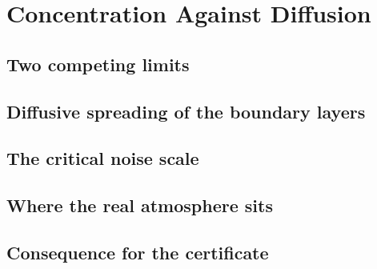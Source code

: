 %

\section{Concentration Against Diffusion}
\label{p3:sec:concentration}

\subsection{Two competing limits}
\label{p3:sub:two_competing_limits}

\subsection{Diffusive spreading of the boundary layers}
\label{p3:sub:diffusive_spreading}

\subsection{The critical noise scale}
\label{p3:sub:critical_noise_scale}

\subsection{Where the real atmosphere sits}
\label{p3:sub:where_the_real_atmosphere_sits}

\subsection{Consequence for the certificate}
\label{p3:sub:consequence_for_certificate}
